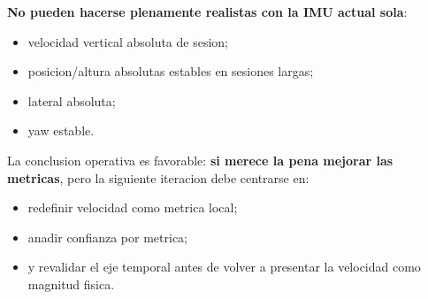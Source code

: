 \documentclass[11pt,a4paper]{article}
\begin{document}
\textbf{No pueden hacerse plenamente realistas con la IMU actual sola}:
\begin{itemize}[leftmargin=14pt]
  \item velocidad vertical absoluta de sesion;
  \item posicion/altura absolutas estables en sesiones largas;
  \item lateral absoluta;
  \item yaw estable.
\end{itemize}

La conclusion operativa es favorable: \textbf{si merece la pena mejorar las metricas}, pero la siguiente iteracion debe centrarse en:
\begin{itemize}[leftmargin=14pt]
  \item redefinir velocidad como metrica local;
  \item anadir confianza por metrica;
  \item y revalidar el eje temporal antes de volver a presentar la velocidad como magnitud fisica.
\end{itemize}
\end{document}
